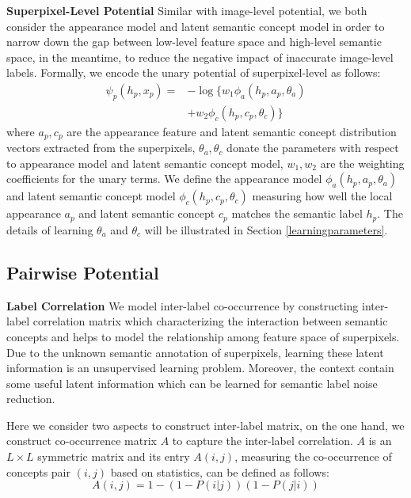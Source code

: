 \textbf{Superpixel-Level Potential}
Similar with image-level potential, we both consider the appearance model and latent semantic concept model in order to narrow down the gap between low-level feature space and high-level semantic space, in the meantime, to reduce the negative impact of inaccurate image-level labels.
Formally, we encode the unary potential of superpixel-level as follows:
\begin{equation}
    \begin{aligned}
        \psi_{p}(h_p,x_p) = &- \log \big\{ w_1\phi_a(h_p,a_p,\theta_a) \\
        &+ w_2\phi_c(h_p,c_p,\theta_c) \big\}
    \end{aligned}
    \label{eq:local}
\end{equation}
where $a_p, c_p$ are the appearance feature and latent semantic concept distribution vectors extracted from the superpixels, $\theta_a, \theta_c$ donate the parameters with respect to appearance model and latent semantic concept model, $w_1,w_2$ are the weighting coefficients for the unary terms.
We define the appearance model $\phi_a(h_p,a_p,\theta_a)$ and latent semantic concept model $\phi_c(h_p,c_p,\theta_c)$ measuring how well the local appearance $a_p$ and latent semantic concept $c_p$ matches the semantic label $h_p$. The details of learning $\theta_a$ and $\theta_c$ will be illustrated in Section \ref{learningparameters}.

\subsection{Pairwise Potential}

\textbf{Label Correlation}
We model inter-label co-occurrence by constructing inter-label correlation matrix which characterizing the interaction between semantic concepts and helps to model the relationship among feature space of superpixels.
Due to the unknown semantic annotation of superpixels, learning these latent information is an unsupervised learning problem.
Moreover, the context contain some useful latent information which can be learned for semantic label noise reduction.

Here we consider two aspects to construct inter-label matrix, on the one hand, we construct co-occurrence matrix $A$ to capture the inter-label correlation. $A$ is an $L \times L$ symmetric matrix and its entry $A(i,j)$, measuring the co-occurrence of concepts pair $(i,j)$ based on statistics, can be defined as follows:
\begin{equation}
    A(i,j) = 1-(1-P(i|j))(1-P(j|i))
\end{equation}

